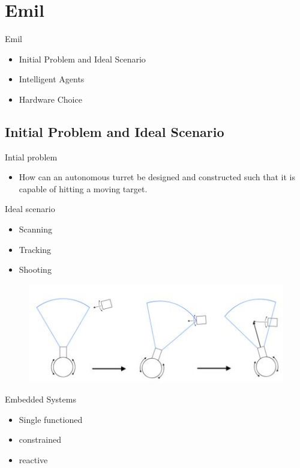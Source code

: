 \section{Emil}
\begin{frame}{Emil}
\begin{itemize}
  \item Initial Problem and Ideal Scenario
  \item Intelligent Agents
  \item Hardware Choice
\end{itemize}
\end{frame}
 
\subsection{Initial Problem and Ideal Scenario}
\begin{frame}{Intial problem}
\begin{itemize}
\item How can an autonomous turret be designed and constructed such
that it is capable of hitting a moving target.
\end{itemize}
\end{frame}

\begin{frame}{Ideal scenario}
\begin{itemize}
  \item Scanning
  \item Tracking
  \item Shooting
\end{itemize}
\begin{figure}
  \includegraphics[scale=0.6]{figures/ideal.JPG}
\end{figure}
\end{frame}

\begin{frame}{Embedded Systems}
\begin{itemize}
  \item Single functioned
  \item constrained
  \item reactive
\end{itemize}
\end{frame}

